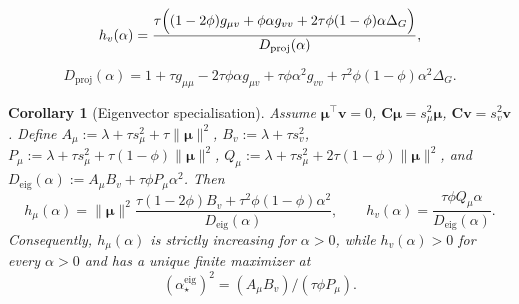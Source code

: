 \documentclass[10pt,a4paper]{amsart}
\newtheorem{corollary}{Corollary}
\newcommand{\C}{\mathbf{C}}
\newcommand{\bmu}{\boldsymbol{\mu}}
\newcommand{\bv}{\mathbf{v}}
\begin{document}
\begin{equation}
\label{eq:lin_hv_exact}
h_v(\alpha)
=
\frac{
\tau\Bigl((1-2\phi)g_{\mu v}
+\phi\alpha g_{vv}
+2\tau\phi(1-\phi)\alpha\Delta_G\Bigr)
}
{D_{\mathrm{proj}}(\alpha)},
\end{equation}

\begin{equation}
\label{eq:lin_Dh}
D_{\mathrm{proj}}(\alpha)
=
1+\tau g_{\mu\mu}
-2\tau\phi\alpha g_{\mu v}
+\tau\phi\alpha^2 g_{vv}
+\tau^2\phi(1-\phi)\alpha^2\Delta_G .
\end{equation}

\begin{corollary}[Eigenvector specialisation]
\label{cor:lin_peak_eigen}
Assume  $\bmu^\top\bv=0$, $\C\bmu=s_\mu^2\bmu$, $\C\bv=s_v^2\bv$. Define $A_\mu:=\lambda+\tau s_\mu^2+\tau\|\bmu\|^2$, $B_v:=\lambda+\tau s_v^2$, $P_\mu:=\lambda+\tau s_\mu^2+\tau(1-\phi)\|\bmu\|^2$, $Q_\mu:=\lambda+\tau s_\mu^2+2\tau(1-\phi)\|\bmu\|^2$, and $D_{\mathrm{eig}}(\alpha):=A_\mu B_v+\tau\phi P_\mu\alpha^2$. Then
\begin{equation}
\label{eq:lin_ab_eigen_compact}
h_\mu(\alpha)
=
\|\bmu\|^2
\frac{\tau(1-2\phi)B_v+\tau^2\phi(1-\phi)\alpha^2}
{D_{\mathrm{eig}}(\alpha)},
\qquad
h_v(\alpha)
=
\frac{\tau\phi Q_\mu\alpha}
{D_{\mathrm{eig}}(\alpha)}.
\end{equation}
Consequently, \(h_\mu(\alpha)\) is strictly increasing for \(\alpha>0\),
while \(h_v(\alpha)>0\) for every \(\alpha>0\) and has a unique finite
maximizer at
\begin{equation}
\label{eq:lin_alpha_star_eigen_compact}
(\alpha_\star^{\mathrm{eig}})^2
=
(A_\mu B_v)/(\tau\phi P_\mu).
\end{equation}
\end{corollary}
\end{document}
